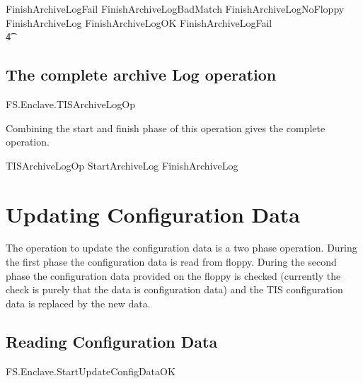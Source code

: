 \begin{zed}
        FinishArchiveLogFail  FinishArchiveLogBadMatch \lor
        FinishArchiveLogNoFloppy
\also
        FinishArchiveLog  FinishArchiveLogOK \lor FinishArchiveLogFail
\\ \t4  \lor
        [~ BadAdminLogout | enclaveStatus = waitingFinishAdminOp
\\ \t6  \land \The currentAdminOp = archiveLog      ~]
\end{zed}

\subsection{The complete archive Log operation}

\begin{traceunit}{FS.Enclave.TISArchiveLogOp}
\end{traceunit}


Combining the start and finish phase of this operation gives the
complete operation.
\begin{zed}
        TISArchiveLogOp  StartArchiveLog \lor FinishArchiveLog
\end{zed}


\section{Updating Configuration Data}

The operation to update the configuration data is a two phase
operation. During the first phase the configuration data is read from
floppy. During the second phase the configuration data provided on the
floppy is checked (currently the check is purely that the data is
configuration data) and the TIS configuration data is replaced by the
new data.


\subsection{Reading Configuration Data}

\begin{traceunit}{FS.Enclave.StartUpdateConfigDataOK}
\end{traceunit}

